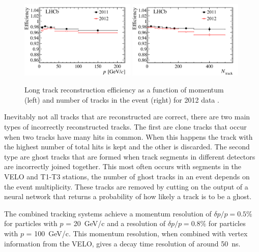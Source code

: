 \begin{figure}[tb] 
  \centering    
  \includegraphics[width=0.49\textwidth]{./Figs/LHC_LHCb/hidef_Fig16topleft.png}
  \includegraphics[width=0.49\textwidth]{./Figs/LHC_LHCb/hidef_Fig16bottomleft.png}
  \caption{Long track reconstruction efficiency as a function of momentum (left) and number of tracks in the event (right) for 2012 data \cite{Aaij:2014pwa}.}
  \label{fig:types_of_tracks}
\end{figure}




Inevitably not all tracks that are reconstructed are correct, there are two main types of incorrectly reconstructed tracks. The first are clone tracks that occur when two tracks have many hits in common. When this happens the track with the highest number of total hits is kept and the other is discarded. The second type are ghost tracks that are formed when track segments in different detectors are incorrectly joined together. This most often occurs with segments in the VELO and T1-T3 stations, the number of ghost tracks in an event depends on the event multiplicity. These tracks are removed by cutting on the output of a neural network that returns a probability of how likely a track is to be a ghost.



The combined tracking systems achieve a momentum resolution of $\delta p / p = 0.5\%$ for particles with $p$ =  20~GeV/c and a resolution of $\delta p / p = 0.8\%$ for particles with $p$ =  100~GeV/c.  This momentum resolution, when combined with vertex information from the VELO, gives a decay time resolution of around 50~ns. 




